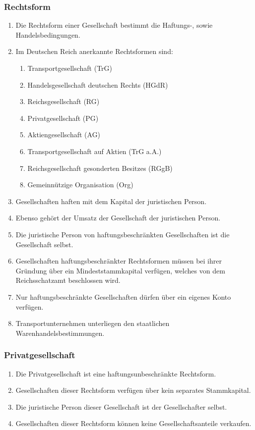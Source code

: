 \documentclass{article}
\begin{document}
\subsubsection{Rechtsform}\label{gesellform}
\begin{enumerate}[(1)]
    \item Die Rechtsform einer Gesellschaft bestimmt die Haftungs-, sowie Handelsbedingungen.
    \item Im Deutschen Reich anerkannte Rechtsformen sind:
        \begin{enumerate}[1.]
            \item Transportgesellschaft (TrG)
            \item Handelsgesellschaft deutschen Rechts (HGdR)
            \item Reichsgesellschaft (RG)
            \item Privatgesellschaft (PG)
            \item Aktiengesellschaft (AG)
            \item Transportgesellschaft auf Aktien (TrG a.A.)
            \item Reichsgesellschaft gesonderten Besitzes (RGgB)
            \item Gemeinnützige Organisation (Org)
        \end{enumerate}
\item Gesellschaften haften mit dem Kapital der juristischen Person.
\item Ebenso gehört der Umsatz der Gesellschaft der juristischen Person.
\item Die juristische Person von haftungsbeschränkten Gesellschaften ist die Gesellschaft selbst.
\item Gesellschaften haftungsbeschränkter Rechtsformen müssen bei ihrer Gründung über ein Mindeststammkapital verfügen, welches von dem Reichsschatzamt beschlossen wird.
\item Nur haftungsbeschränkte Gesellschaften dürfen über ein eigenes Konto verfügen.
\item Transportunternehmen unterliegen den staatlichen Warenhandelsbestimmungen.
\end{enumerate}

\subsubsection{Privatgesellschaft}
\begin{enumerate}[(1)]
    \item Die Privatgesellschaft ist eine haftungsunbeschränkte Rechtsform.
    \item Gesellschaften dieser Rechtsform verfügen über kein separates Stammkapital.
    \item Die juristische Person dieser Gesellschaft ist der Gesellschafter selbst.
    \item Gesellschaften dieser Rechtsform können keine Gesellschaftsanteile verkaufen.
\end{enumerate}
\end{document}
